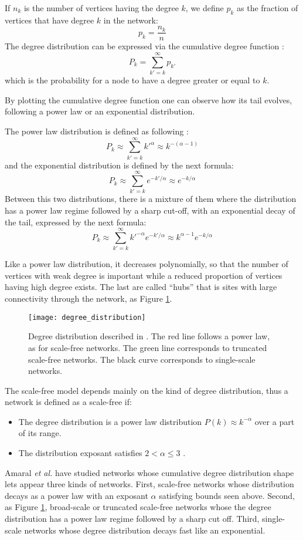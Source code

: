 If $n_k$ is the number of vertices having the degree $k$, we define $p_k$ as the fraction of vertices that have degree $k$ in the network:
\[ p_k = \frac{n_k}{n}\]
The degree distribution can be expressed via the cumulative degree function \cite{newman2002structure,erdds1959random}:
\[ P_k = \sum_{k' = k}^{\infty} p_{k'}\]
which is the probability for a node to have a degree greater or equal to $k$.

By plotting the cumulative degree function one can observe how its tail evolves, following a power law or an exponential distribution.

The power law distribution is defined as following \cite{newman2002structure}:
\[ P_k \approx \sum_{k'=k}^{\infty} k'^{\alpha} \approx k^{-(\alpha-1)}\]
and the exponential distribution is defined by the next formula:
\[ P_k \approx \sum_{k'=k}^{\infty} e^{-k' / \alpha} \approx e^{-k / \alpha}\]
Between this two distributions, there is a mixture of them where the distribution has a power law regime followed by a sharp cut-off, with an exponential decay of the tail, expressed by the next formula:
\[ P_k \approx \sum_{k'=k}^{\infty} k'^{-\alpha} e^{-k' / \alpha} \approx k^{\alpha-1} e^{-k / \alpha}\]

Like a power law distribution, it decreases polynomially, so that the number of vertices with weak degree is important while a reduced proportion of vertices having high degree exists. The last are called \enquote{hubs} that is sites with large connectivity through the network, as Figure \ref{fig:degree_distribution}.
\begin{figure}[h]
\centering
\texttt{[image: degree\_distribution]}
\caption {Degree distribution described in \cite{amaral2000classes}. The red line follows a power law, as for scale-free networks. The green line corresponds to truncated scale-free networks. The black curve corresponds to single-scale networks.}
\label {fig:degree_distribution}
\end{figure}
The scale-free model depends mainly on the kind of degree distribution, thus a network is defined as a scale-free if:
\begin{itemize}
\item The degree distribution is a power law distribution $P(k) \approx k^{-\alpha}$ over a part of its range.
\item The distribution exposant satisfies $2 < \alpha \le 3$ \cite{goh2001universal}.
\end{itemize}
Amaral \textit{et al.} \cite{amaral2000classes} have studied networks whose cumulative degree distribution shape lets appear three kinds of networks. First, scale-free networks whose distribution decays as a power law with an exposant $\alpha$ satisfying bounds seen above. Second, as Figure \ref{fig:degree_distribution}, broad-scale or truncated scale-free networks whose the degree distribution has a power law regime followed by a sharp cut off. Third, single-scale networks whose degree distribution decays fast like an exponential.
